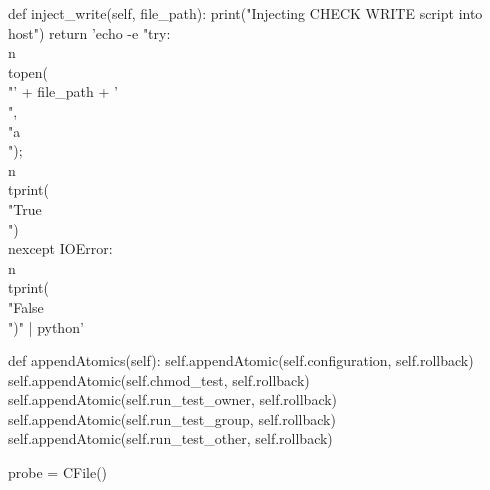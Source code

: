 \begin{python}
	def inject_write(self, file_path):
		print("Injecting CHECK WRITE script into host")
		return 'echo -e "try:\\n\\topen(\\"' + file_path + '\\",\\"a\\");\\n\\tprint(\\"True\\")\\nexcept IOError:\\n\\tprint(\\"False\\")" | python'


	def appendAtomics(self):
		self.appendAtomic(self.configuration, self.rollback)
		self.appendAtomic(self.chmod_test, self.rollback)
		self.appendAtomic(self.run_test_owner, self.rollback)
		self.appendAtomic(self.run_test_group, self.rollback)
		self.appendAtomic(self.run_test_other, self.rollback)


probe = CFile()
\end{python}
\label{app:confid}
\fi